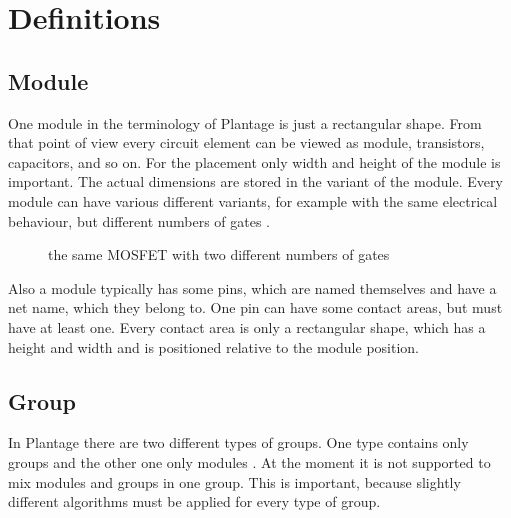 \chapter{Definitions}

\section{Module}
One module in the terminology of Plantage is just a rectangular shape. From that point of view every circuit element can be viewed as module, transistors, capacitors, and so on. For the placement only width and height of the module is important. The actual dimensions are stored in the variant of the module. Every module can have various different variants, for example with the same electrical behaviour, but different numbers of gates .

\begin{figure}
	\centering
	
	\caption{the same MOSFET with two different numbers of gates}
	\label{fig:modules_with_different_gate_number}
\end{figure}

Also a module typically has some pins, which are named themselves and have a net name, which they belong to. One pin can have some contact areas, but must have at least one. Every contact area is only a rectangular shape, which has a height and width and is positioned relative to the module position.

\section{Group}
In Plantage there are two different types of groups. One type contains only groups and the other one only modules . At the moment it is not supported to mix modules and groups in one group. This is important, because slightly different algorithms must be applied for every type of group.


